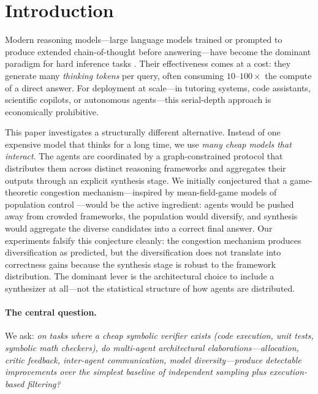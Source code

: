 \documentclass[11pt]{amsart}
\newcommand\1{{\mathds{1}}}
\theoremstyle{definition}
\theoremstyle{remark}
\numberwithin{equation}{section}
\begin{document}

\maketitle

\section{Introduction}\label{sec:intro}

Modern reasoning models---large language models trained or prompted to produce extended chain-of-thought before answering---have become the dominant paradigm for hard inference tasks \cite{Wei2022CoT, Wang2023SelfConsistency}.
Their effectiveness comes at a cost: they generate many \emph{thinking tokens} per query, often consuming $10$--$100\times$ the compute of a direct answer.
For deployment at scale---in tutoring systems, code assistants, scientific copilots, or autonomous agents---this serial-depth approach is economically prohibitive.

This paper investigates a structurally different alternative.
Instead of one expensive model that thinks for a long time, we use \emph{many cheap models that interact}.
The agents are coordinated by a graph-constrained protocol that distributes them across distinct reasoning frameworks and aggregates their outputs through an explicit synthesis stage.
We initially conjectured that a game-theoretic congestion mechanism---inspired by mean-field-game models of population control \cite{LasryLions2007, HuangMalhameCaines2006, Gomes2010}---would be the active ingredient: agents would be pushed away from crowded frameworks, the population would diversify, and synthesis would aggregate the diverse candidates into a correct final answer.
Our experiments falsify this conjecture cleanly: the congestion mechanism produces diversification as predicted, but the diversification does not translate into correctness gains because the synthesis stage is robust to the framework distribution. The dominant lever is the architectural choice to include a synthesizer at all---not the statistical structure of how agents are distributed.

\paragraph{The central question.}
We ask: \emph{on tasks where a cheap symbolic verifier exists (code execution, unit tests, symbolic math checkers), do multi-agent architectural elaborations---allocation, critic feedback, inter-agent communication, model diversity---produce detectable improvements over the simplest baseline of independent sampling plus execution-based filtering?}
\end{document}
